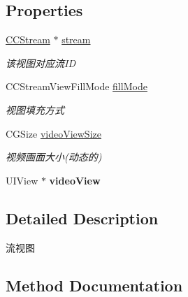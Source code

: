 \subsection*{Properties}
\begin{DoxyCompactItemize}
\item 
\mbox{\label{interface_c_c_stream_view_a258b3c6eef0d353d7bca24e4f61f7f78}} 
\hyperlink{interface_c_c_stream}{C\+C\+Stream} $\ast$ \hyperlink{interface_c_c_stream_view_a258b3c6eef0d353d7bca24e4f61f7f78}{stream}
\begin{DoxyCompactList}\small\item\em 该视图对应流\+ID \end{DoxyCompactList}\item 
\mbox{\label{interface_c_c_stream_view_aff0922102b8ef404e6968887efc4388a}} 
C\+C\+Stream\+View\+Fill\+Mode \hyperlink{interface_c_c_stream_view_aff0922102b8ef404e6968887efc4388a}{fill\+Mode}
\begin{DoxyCompactList}\small\item\em 视图填充方式 \end{DoxyCompactList}\item 
\mbox{\label{interface_c_c_stream_view_a26608e3bfad777afca8b2566ee71f21b}} 
C\+G\+Size \hyperlink{interface_c_c_stream_view_a26608e3bfad777afca8b2566ee71f21b}{video\+View\+Size}
\begin{DoxyCompactList}\small\item\em 视频画面大小(动态的) \end{DoxyCompactList}\item 
\mbox{\label{interface_c_c_stream_view_a76413209ee4b57512e0df74ecddd4a71}} 
U\+I\+View $\ast$ {\bfseries video\+View}
\end{DoxyCompactItemize}


\subsection{Detailed Description}
流视图 

\subsection{Method Documentation}
\mbox{\label{interface_c_c_stream_view_a0a8eebb75951ae2ae5ae7ff9ec498b3d}} 
